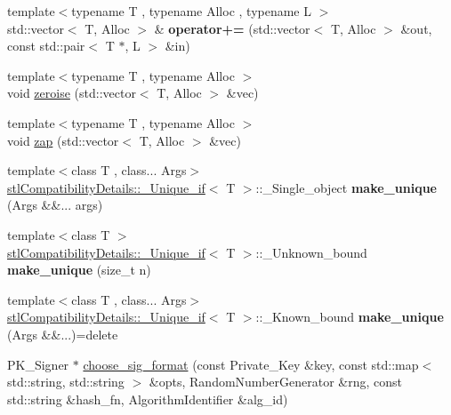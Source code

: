 \begin{DoxyCompactItemize}
{\footnotesize template$<$typename T , typename Alloc , typename L $>$ }\\std\+::vector$<$ T, Alloc $>$ \& {\bfseries operator+=} (std\+::vector$<$ T, Alloc $>$ \&out, const std\+::pair$<$ T $\ast$, L $>$ \&in)
\item 
{\footnotesize template$<$typename T , typename Alloc $>$ }\\void \hyperlink{namespace_botan_a09ce987463cc4e1b7682f31bb486fdb1}{zeroise} (std\+::vector$<$ T, Alloc $>$ \&vec)
\item 
{\footnotesize template$<$typename T , typename Alloc $>$ }\\void \hyperlink{namespace_botan_a2534f0fffcfe960b963990832bd1d26e}{zap} (std\+::vector$<$ T, Alloc $>$ \&vec)
\item 
\mbox{\label{namespace_botan_a3811c4287a0d079ec6e9b410972e9143}} 
{\footnotesize template$<$class T , class... Args$>$ }\\\hyperlink{struct_botan_1_1stl_compatibility_details_1_1___unique__if}{stl\+Compatibility\+Details\+::\+\_\+\+Unique\+\_\+if}$<$ T $>$\+::\+\_\+\+Single\+\_\+object {\bfseries make\+\_\+unique} (Args \&\&... args)
\item 
\mbox{\label{namespace_botan_a4c08c160dffb172a0d2d9bf337f1f199}} 
{\footnotesize template$<$class T $>$ }\\\hyperlink{struct_botan_1_1stl_compatibility_details_1_1___unique__if}{stl\+Compatibility\+Details\+::\+\_\+\+Unique\+\_\+if}$<$ T $>$\+::\+\_\+\+Unknown\+\_\+bound {\bfseries make\+\_\+unique} (size\+\_\+t n)
\item 
\mbox{\label{namespace_botan_a180599704059ab6286b035d87dbbeb89}} 
{\footnotesize template$<$class T , class... Args$>$ }\\\hyperlink{struct_botan_1_1stl_compatibility_details_1_1___unique__if}{stl\+Compatibility\+Details\+::\+\_\+\+Unique\+\_\+if}$<$ T $>$\+::\+\_\+\+Known\+\_\+bound {\bfseries make\+\_\+unique} (Args \&\&...)=delete
\item 
P\+K\+\_\+\+Signer $\ast$ \hyperlink{namespace_botan_a6eb0cbf46c7168e09e5887efb25c3987}{choose\+\_\+sig\+\_\+format} (const Private\+\_\+\+Key \&key, const std\+::map$<$ std\+::string, std\+::string $>$ \&opts, Random\+Number\+Generator \&rng, const std\+::string \&hash\+\_\+fn, Algorithm\+Identifier \&alg\+\_\+id)
\end{DoxyCompactItemize}
